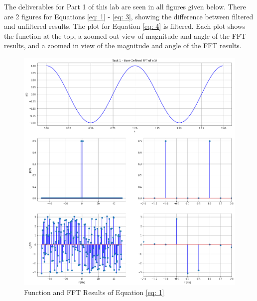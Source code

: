 \documentclass[12pt]{report}
\begin{document}
The deliverables for Part 1 of this lab are seen in all figures given below. There are 2 figures for Equations \eqref{eq: 1} - \eqref{eq: 3}, showing the difference
between filtered and unfiltered results. The plot for Equation \eqref{eq: 4} is filtered. Each plot shows the function at the top, a zoomed out view of magnitude and angle
of the FFT results, and a zoomed in view of the magnitude and angle of the FFT results.
\\
\begin{figure}[h!]
  \centering
  \includegraphics[width=\linewidth]{p1t1.png}
  \caption{Function and FFT Results of Equation \eqref{eq: 1}}
  \label{fig: p1t1}
\end{figure}
\end{document}
